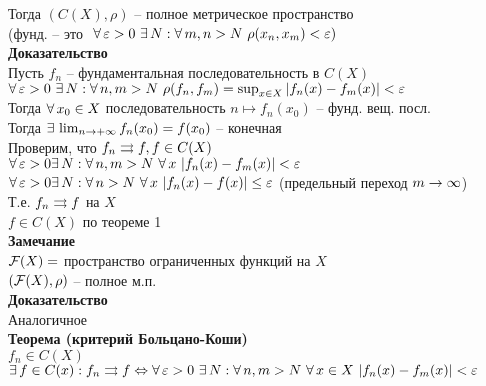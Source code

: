 \documentclass[12pt]{article}
\begin{document}
Тогда $(C(X), \rho)$ -- полное метрическое пространство\\
(фунд. -- это $\ \forall\, \varepsilon > 0\ \exists\, N: \forall\, m,n > N\ \rho(x_n, x_m) < \varepsilon)$\\
\textbf{Доказательство}\\
Пусть $f_n$ -- фундаментальная последовательность в $C(X)$\\
$\fall \eps > 0\ \ex N : \fall n, m > N\ \rho(f_n, f_m) = \sup_{x \in X} |f_n(x) - f_m(x)| < \eps$\\
Тогда $\forall\, x_0 \in X$ последовательность $n \mapsto f_n(x_0)$ -- фунд. вещ. посл.\\
Тогда $\exists\, \lim_{n\rightarrow +\infty} f_n(x_0) = f(x_0)$ -- конечная\\
Проверим, что $f_n \rightrightarrows f, f \in C(X)$\\
$\fall \eps > 0 \ex N: \fall n, m > N\ \fall x\ |f_n(x) - f_m(x)| < \eps$\\
$\fall \eps > 0 \ex N: \fall n > N\ \fall x\ |f_n(x) - f(x)| \leq \eps$ (предельный переход $m \rightarrow \infty$)\\
Т.е. $f_n \rightrightarrows f$ на $X$\\
$f\in C(X)$ по теореме 1\\
\textbf{Замечание}\\
$\mathcal F(X) = $ пространство ограниченных функций на $X$\\
$(\mathcal F(X), \rho)$ -- полное м.п.\\
\textbf{Доказательство}\\
Аналогичное\\
\textbf{Теорема (критерий Больцано-Коши)}\\
$f_n \in C(X)$\\
$\exists\, f \in C(x): f_n \rightrightarrows f \Leftrightarrow \forall\, \varepsilon > 0\ \exists\, N: \forall\, n,m > N\ \forall\, x \in X\ |f_n(x)-f_m(x)| < \varepsilon$\\
\end{document}
